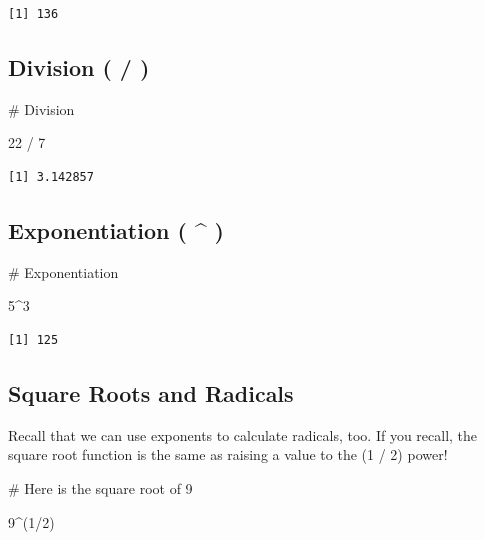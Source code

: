 \documentclass[
  letterpaper,
  DIV=11,
  numbers=noendperiod]{scrreprt}
\newenvironment{Shaded}{\begin{snugshade}}{\end{snugshade}}
\newcommand{\CommentTok}[1]{\textcolor[rgb]{0.37,0.37,0.37}{#1}}
\newcommand{\DecValTok}[1]{\textcolor[rgb]{0.68,0.00,0.00}{#1}}
\newcommand{\NormalTok}[1]{\textcolor[rgb]{0.00,0.23,0.31}{#1}}
\newcommand{\SpecialCharTok}[1]{\textcolor[rgb]{0.37,0.37,0.37}{#1}}
\begin{document}
\begin{verbatim}
[1] 136
\end{verbatim}

\subsection*{Division ( / )}\label{division}

\begin{Shaded}
\begin{Highlighting}[]
\CommentTok{\# Division}

\DecValTok{22} \SpecialCharTok{/} \DecValTok{7}
\end{Highlighting}
\end{Shaded}

\begin{verbatim}
[1] 3.142857
\end{verbatim}

\subsection*{Exponentiation ( \^{} )}\label{exponentiation}

\begin{Shaded}
\begin{Highlighting}[]
\CommentTok{\# Exponentiation}

\DecValTok{5}\SpecialCharTok{\^{}}\DecValTok{3}
\end{Highlighting}
\end{Shaded}

\begin{verbatim}
[1] 125
\end{verbatim}

\subsection*{Square Roots and Radicals}\label{square-roots-and-radicals}

Recall that we can use exponents to calculate radicals, too. If you
recall, the square root function is the same as raising a value to the
(1 / 2) power!

\begin{Shaded}
\begin{Highlighting}[]
\CommentTok{\# Here is the square root of 9}

\DecValTok{9}\SpecialCharTok{\^{}}\NormalTok{(}\DecValTok{1}\SpecialCharTok{/}\DecValTok{2}\NormalTok{)}
\end{Highlighting}
\end{Shaded}
\end{document}

